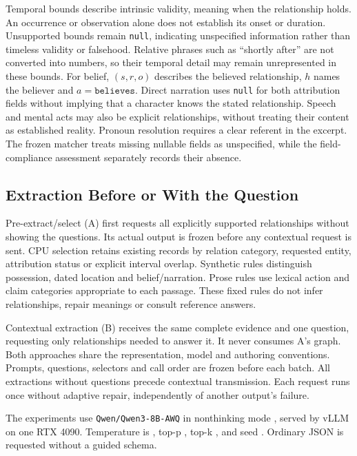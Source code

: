 \documentclass[a4paper,twoside]{article}
\begin{document}
Temporal bounds describe intrinsic validity, meaning when the relationship holds. An occurrence or observation alone does not establish its onset or duration. Unsupported bounds remain \texttt{null}, indicating unspecified information rather than timeless validity or falsehood. Relative phrases such as ``shortly after'' are not converted into numbers, so their temporal detail may remain unrepresented in these bounds.
For belief, $(s,r,o)$ describes the believed relationship, $h$ names the believer and $a=\texttt{believes}$. Direct narration uses \texttt{null} for both attribution fields without implying that a character knows the stated relationship. Speech and mental acts may also be explicit relationships, without treating their content as established reality.
Pronoun resolution requires a clear referent in the excerpt. The frozen matcher treats missing nullable fields as unspecified, while the field-compliance assessment separately records their absence.



\subsection{Extraction Before or With the Question}
\noindent Pre-extract/select (A) first requests all explicitly supported relationships without showing the questions. Its actual output is frozen before any contextual request is sent. CPU selection retains existing records by relation category, requested entity, attribution status or explicit interval overlap. Synthetic rules distinguish possession, dated location and belief/narration. Prose rules use lexical action and claim categories appropriate to each passage. These fixed rules do not infer relationships, repair meanings or consult reference answers.

Contextual extraction (B) receives the same complete evidence and one question, requesting only relationships needed to answer it. It never consumes A's graph. Both approaches share the representation, model and authoring conventions. Prompts, questions, selectors and call order are frozen before each batch. All extractions without questions precede contextual transmission. Each request runs once without adaptive repair, independently of another output's failure.

The experiments use \texttt{Qwen/Qwen3-8B-AWQ} in nonthinking mode \cite{qwen2025,qwenmodel}, served by vLLM \cite{kwon2023} on one RTX 4090. Temperature is \Temperature, top-p \TopP, top-k \TopK, and seed \Seed.  Ordinary JSON is requested without a guided schema. 
\end{document}
